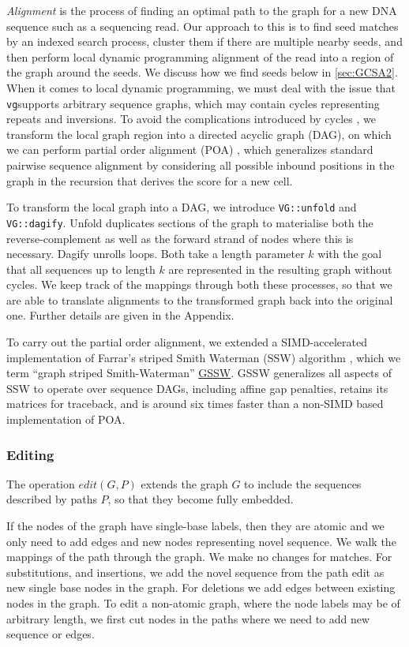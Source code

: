 \documentclass[12pt]{article}
\newcommand{\vg}{{\tt vg}}
\begin{document}
\emph{Alignment} is the process of finding an optimal path to the graph for a new DNA sequence such as a sequencing read.
Our approach to this is to find seed matches by an indexed search process, cluster them if there are multiple nearby seeds, and then perform local dynamic programming alignment of the read into a region of the graph around the seeds.  
We discuss how we find seeds below in \ref{sec:GCSA2}.
When it comes to local dynamic programming, we must deal with the issue that \vg supports arbitrary sequence graphs, which may contain cycles representing repeats and inversions.  
To avoid the complications introduced by cycles \cite{myers1989}, we transform the local graph region into a directed acyclic graph (DAG), on which we can perform
partial order alignment (POA) \cite{lee2002POA}, which generalizes standard pairwise sequence alignment by considering all possible inbound 
positions in the graph in the recursion that derives the score for a new cell.

To transform the local graph into a DAG, we introduce {\tt VG::unfold} and {\tt VG::dagify}.  
Unfold duplicates sections of the graph to materialise both the reverse-complement as well as the forward strand of nodes where this is necessary.  
Dagify unrolls loops.  
Both take a length parameter $k$ with the goal that all sequences up to length $k$ are represented in the resulting graph without cycles.
We keep track of the mappings through both these processes, so that we are able to translate alignments to the transformed graph back into the original one.
Further details are given in the Appendix.

To carry out the partial order alignment, we extended a SIMD-accelerated implementation \cite{zhao2013} of Farrar's  striped Smith Waterman (SSW) algorithm \cite{farrar2007}, which we term ``graph striped Smith-Waterman'' \href{https://github.com/ekg/gssw}{GSSW}.
GSSW generalizes all aspects of SSW to operate over sequence DAGs, including affine gap penalties, retains its matrices for traceback, and is around six times faster than a non-SIMD based implementation of POA.

\subsubsection{Editing}

The operation $edit(G, P)$ extends the graph $G$ to include the sequences described by paths $P$, so that they become fully embedded.

If the nodes of the graph have single-base labels, then they are atomic and we only need to add edges and new nodes representing novel sequence.
We walk the mappings of the path through the graph.
We make no changes for matches.
For substitutions, and insertions, we add the novel sequence from the path edit as new single base nodes in the graph.
For deletions we add edges between existing nodes in the graph.
To edit a non-atomic graph, where the node labels may be of arbitrary length, we first cut nodes in the paths where we need to add new sequence or edges. 
\end{document}
